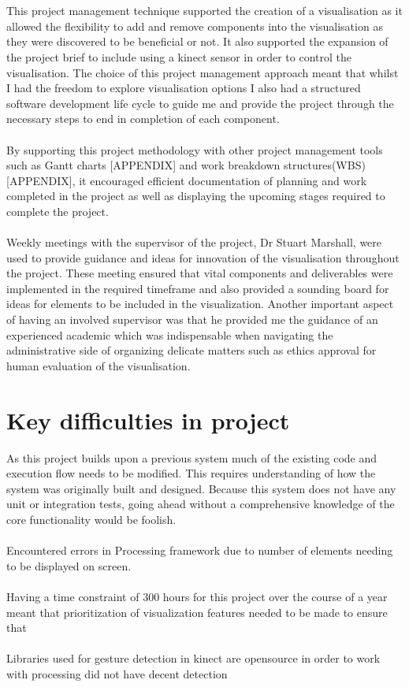 \\\\
This project management technique supported the creation of a visualisation as it allowed the flexibility to add and remove components into the visualisation as they were discovered to be beneficial or not. It also supported the expansion of the project brief to include using a kinect sensor in order to control the visualisation. The choice of this project management approach meant that whilst I had the freedom to explore visualisation options I also had a structured software development life cycle to guide me and provide the project through the necessary steps to end in completion of each component.
\\\\
By supporting this project methodology with other project management tools such as Gantt charts [APPENDIX] and work breakdown structures(WBS) [APPENDIX], it encouraged efficient documentation of planning and work completed in the project as well as displaying the upcoming stages required to complete the project.
\\\\
Weekly meetings with the supervisor of the project, Dr Stuart Marshall, were used to provide guidance and ideas for innovation of the visualisation throughout the project. These meeting ensured that vital components and deliverables were implemented in the required timeframe and also provided a sounding board for ideas for elements to be included in the visualization. Another important aspect of having an involved supervisor was that he provided me the guidance of an experienced academic which was indispensable when navigating the administrative side of organizing delicate matters such as ethics approval for human evaluation of the visualisation.


\section{Key difficulties in project}
As this project builds upon a previous system much of the existing code and execution flow needs to be modified. This requires understanding of how the system was originally built and designed. Because this system does not have any unit or integration tests, going ahead without a comprehensive knowledge of the core functionality would be foolish.
\\\\
Encountered errors in Processing framework due to number of elements needing to be displayed on screen. 
\\\\
Having a time constraint of 300 hours for this project over the course of a year meant that prioritization of visualization features needed to be made to ensure that 
\\\\
Libraries used for gesture detection in kinect are opensource in order to work with processing did not have decent detection